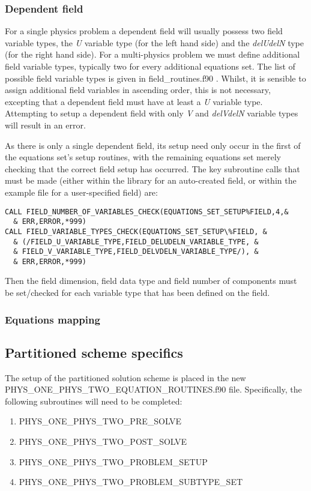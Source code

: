 \subsubsection{Dependent field}

For a single physics problem a dependent field will usually possess two field variable types, the \textit{U} variable type (for the left hand side) and the \textit{delUdelN} type (for the right hand side). For a multi-physics problem we must define additional field variable types, typically two for every additional equations set. The list of possible field variable types is given in field\_routines.f90 . Whilst, it is sensible to assign additional field variables in ascending order, this is not necessary, excepting that a dependent field must have at least a \textit{U} variable type. Attempting to setup a dependent field with only \textit{V} and \textit{delVdelN} variable types will result in an error.

As there is only a single dependent field, its setup need only occur in the first of the equations set's setup routines, with the remaining equations set merely checking that the correct field setup has occurred. The key subroutine calls that must be made (either within the library for an auto-created field, or within the example file for a user-specified field) are:

\begin{lstlisting}
CALL FIELD_NUMBER_OF_VARIABLES_CHECK(EQUATIONS_SET_SETUP%FIELD,4,&
  & ERR,ERROR,*999)
CALL FIELD_VARIABLE_TYPES_CHECK(EQUATIONS_SET_SETUP\%FIELD, &
  & (/FIELD_U_VARIABLE_TYPE,FIELD_DELUDELN_VARIABLE_TYPE, &
  & FIELD_V_VARIABLE_TYPE,FIELD_DELVDELN_VARIABLE_TYPE/), &
  & ERR,ERROR,*999)
\end{lstlisting}
Then the field dimension, field data type and field number of components must be set/checked for each variable type that has been defined on the field.

\subsubsection{Equations mapping}

\subsection{Partitioned scheme specifics}
\label{partitionspec}
The setup of the partitioned solution scheme is placed in the new PHYS\_ONE\_PHYS\_TWO\_EQUATION\_ROUTINES.f90 file. Specifically, the following subroutines will need to be completed:
\begin{enumerate}
 \item PHYS\_ONE\_PHYS\_TWO\_PRE\_SOLVE
 \item PHYS\_ONE\_PHYS\_TWO\_POST\_SOLVE
 \item PHYS\_ONE\_PHYS\_TWO\_PROBLEM\_SETUP
 \item PHYS\_ONE\_PHYS\_TWO\_PROBLEM\_SUBTYPE\_SET
\end{enumerate}


